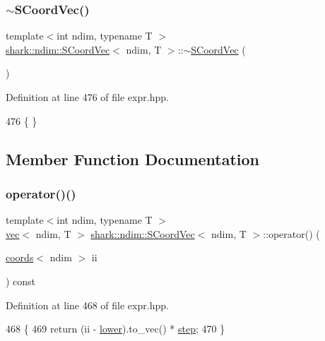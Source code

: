 \subsubsection{\texorpdfstring{$\sim$\+S\+Coord\+Vec()}{~SCoordVec()}}
{\footnotesize\ttfamily template$<$int ndim, typename T $>$ \\
\hyperlink{classshark_1_1ndim_1_1_s_coord_vec}{shark\+::ndim\+::\+S\+Coord\+Vec}$<$ ndim, T $>$\+::$\sim$\hyperlink{classshark_1_1ndim_1_1_s_coord_vec}{S\+Coord\+Vec} (\begin{DoxyParamCaption}{ }\end{DoxyParamCaption})}



Definition at line 476 of file expr.\+hpp.


\begin{DoxyCode}
476 \{ \}
\end{DoxyCode}


\subsection{Member Function Documentation}
\hypertarget{classshark_1_1ndim_1_1_s_coord_vec_abad6eb3a4c0fdd994227b8beeee7f86a}{}\label{classshark_1_1ndim_1_1_s_coord_vec_abad6eb3a4c0fdd994227b8beeee7f86a} 
\subsubsection{\texorpdfstring{operator()()}{operator()()}}
{\footnotesize\ttfamily template$<$int ndim, typename T $>$ \\
\hyperlink{structshark_1_1ndim_1_1vec}{vec}$<$ ndim, T $>$ \hyperlink{classshark_1_1ndim_1_1_s_coord_vec}{shark\+::ndim\+::\+S\+Coord\+Vec}$<$ ndim, T $>$\+::operator() (\begin{DoxyParamCaption}\item[{\hyperlink{structshark_1_1ndim_1_1coords}{coords}$<$ ndim $>$}]{ii }\end{DoxyParamCaption}) const\hspace{0.3cm}{\ttfamily [inline]}}



Definition at line 468 of file expr.\+hpp.


\begin{DoxyCode}
468                                                                               \{
469             \textcolor{keywordflow}{return} (ii - \hyperlink{classshark_1_1ndim_1_1_s_coord_vec_aec6b26f59abee649139be7a517101d04}{lower}).to\_vec() * \hyperlink{classshark_1_1ndim_1_1_s_coord_vec_aa2ce747ed08501f5fe6bf4a8c6b25a20}{step};
470         \}
\end{DoxyCode}


